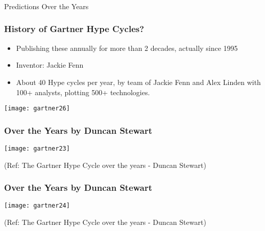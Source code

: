 \begin{frame}[fragile]\frametitle{}
\begin{center}
{\Large Predictions Over the Years}
\end{center}
\end{frame}

\begin{frame}[fragile]\frametitle{History of Gartner Hype Cycles?}

\begin{itemize}
\item Publishing these annually for more than 2 decades, actually since 1995
\item Inventor: Jackie Fenn
\item About 40 Hype cycles per year, by team of Jackie Fenn and Alex Linden with 100+ analysts, plotting 500+ technologies.
\end{itemize}

\begin{center}
\texttt{[image: gartner26]}
\end{center}

\end{frame}


\begin{frame}[fragile]\frametitle{Over the Years by Duncan Stewart}


\begin{center}
\texttt{[image: gartner23]}
\end{center}


{\tiny (Ref: The Gartner Hype Cycle over the years - Duncan Stewart)}

\end{frame}

\begin{frame}[fragile]\frametitle{Over the Years by Duncan Stewart}

\begin{center}
\texttt{[image: gartner24]}
\end{center}


{\tiny (Ref: The Gartner Hype Cycle over the years - Duncan Stewart)}

\end{frame}

